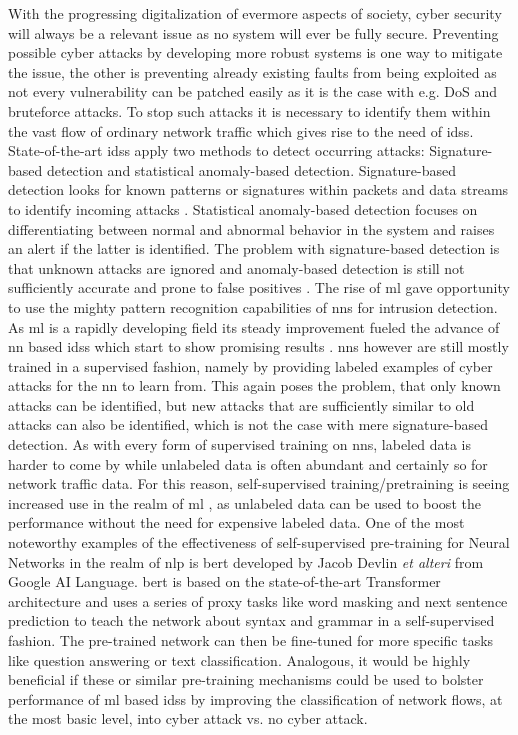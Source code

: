 \begin{itemize}
	With the progressing digitalization of evermore aspects of society, cyber security will always be a relevant issue as no system will ever be fully secure. Preventing possible cyber attacks by developing more robust systems is one way to mitigate the issue, the other is preventing already existing faults from being exploited as not every vulnerability can be patched easily as it is the case with e.g. DoS and bruteforce attacks. To stop such attacks it is necessary to identify them within the vast flow of ordinary network traffic which gives rise to the need of \glspl{ids}. State-of-the-art \glspl{ids} apply two methods to detect occurring attacks: Signature-based detection and statistical anomaly-based detection. Signature-based detection looks for known patterns or signatures within packets and data streams to identify incoming attacks . Statistical anomaly-based detection focuses on differentiating between normal and abnormal behavior in the system and raises an alert if the latter is identified. The problem with signature-based detection is that unknown attacks are ignored and anomaly-based detection is still not sufficiently accurate and prone to false positives . The rise of \gls{ml} gave opportunity to use the mighty pattern recognition capabilities of \glspl{nn} for intrusion detection. As \gls{ml} is a rapidly developing field its steady improvement fueled the advance of \gls{nn} based \glspl{ids} 
	which start to show promising results . \glspl{nn} however are still mostly trained in a supervised fashion, namely by providing labeled examples of cyber attacks for the \gls{nn} to learn from. This again poses the problem, that only known attacks can be identified, but new attacks that are sufficiently similar to old attacks can also be identified, which is not the case with mere signature-based detection. As with every form of supervised training on \glspl{nn}, labeled data is harder to come by while unlabeled data is often abundant and certainly so for network traffic data. For this reason, self-supervised training/pretraining is seeing increased use in the realm of \gls{ml} , as unlabeled data can be used to boost the performance without the need for expensive labeled data. One of the most noteworthy examples of the effectiveness of self-supervised pre-training for Neural Networks in the realm of \gls{nlp} is \gls{bert} \cite{bert} developed by Jacob Devlin \textit{et alteri} from Google AI Language. \gls{bert} is based on the state-of-the-art Transformer architecture \cite{attention} and uses a series of proxy tasks like word masking and next sentence prediction to teach the network about syntax and grammar in a self-supervised fashion. The pre-trained network can then be fine-tuned for more specific tasks like question answering or text classification. Analogous, it would be highly beneficial if these or similar pre-training mechanisms could be used to bolster performance of \gls{ml} based \glspl{ids} by improving the classification of network flows, at the most basic level, into cyber attack vs. no cyber attack. \par

\end{itemize}
